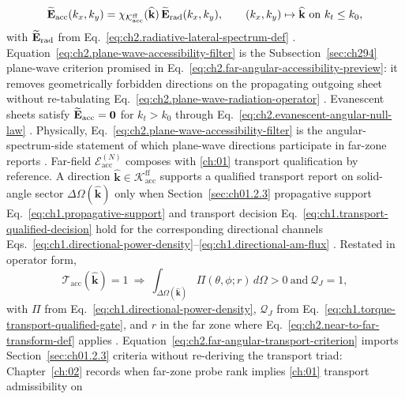 \begin{equation}
\label{eq:ch2.plane-wave-accessibility-filter}
\widetilde{\mathbf{E}}_{\mathrm{acc}}(k_x,k_y)
=
\chi_{\mathcal{K}_{\mathrm{acc}}^{\mathrm{ff}}}(\widehat{\mathbf{k}})\,
\widetilde{\mathbf{E}}_{\mathrm{rad}}(k_x,k_y),
\qquad
(k_x,k_y)\mapsto\widehat{\mathbf{k}}\ \text{on}\ k_t\le k_0,
\end{equation}
with \(\widetilde{\mathbf{E}}_{\mathrm{rad}}\) from Eq.~\eqref{eq:ch2.radiative-lateral-spectrum-def}
\cite{stratton1941}. Equation~\eqref{eq:ch2.plane-wave-accessibility-filter}
is the Subsection~\ref{sec:ch294} plane-wave criterion promised in
Eq.~\eqref{eq:ch2.far-angular-accessibility-preview}: it removes geometrically forbidden
directions on the propagating outgoing sheet without re-tabulating
Eq.~\eqref{eq:ch2.plane-wave-radiation-operator} \cite{stratton1941}. Evanescent sheets satisfy
\(\widetilde{\mathbf{E}}_{\mathrm{acc}}=\mathbf{0}\) for \(k_t>k_0\) through
Eq.~\eqref{eq:ch2.evanescent-angular-null-law} \cite{stratton1941}. Physically,
Eq.~\eqref{eq:ch2.plane-wave-accessibility-filter} is the angular-spectrum-side statement of which
plane-wave directions participate in far-zone reports \cite{jackson1999}.
Far-field $\mathcal{E}_{\mathrm{acc}}^{(N)}$ composes with \ref{ch:01} transport qualification by reference.
A direction \(\widehat{\mathbf{k}}\in\mathcal{K}_{\mathrm{acc}}^{\mathrm{ff}}\) supports a
qualified transport report on solid-angle sector \(\Delta\Omega(\widehat{\mathbf{k}})\) only when
Section~\ref{sec:ch01.2.3} propagative support Eq.~\eqref{eq:ch1.propagative-support} and
transport decision Eq.~\eqref{eq:ch1.transport-qualified-decision} hold for the corresponding
directional channels Eqs.~\eqref{eq:ch1.directional-power-density}--\eqref{eq:ch1.directional-am-flux}
\cite{stratton1941}. Restated in operator form,
\begin{equation}
\label{eq:ch2.far-angular-transport-criterion}
\mathcal{T}_{\mathrm{acc}}(\widehat{\mathbf{k}})=1
\ \Longrightarrow\
\int_{\Delta\Omega(\widehat{\mathbf{k}})}\Pi(\theta,\phi;r)\,d\Omega>0
\ \text{and}\ 
\mathcal{Q}_{J}=1,
\end{equation}
with \(\Pi\) from Eq.~\eqref{eq:ch1.directional-power-density},
\(\mathcal{Q}_{J}\) from Eq.~\eqref{eq:ch1.torque-transport-qualified-gate}, and
\(r\) in the far zone where Eq.~\eqref{eq:ch2.near-to-far-transform-def} applies
\cite{stratton1941}. Equation~\eqref{eq:ch2.far-angular-transport-criterion} imports
Section~\ref{sec:ch01.2.3} criteria without re-deriving the transport triad: Chapter~\ref{ch:02}
records when far-zone probe rank implies \ref{ch:01} transport admissibility on
